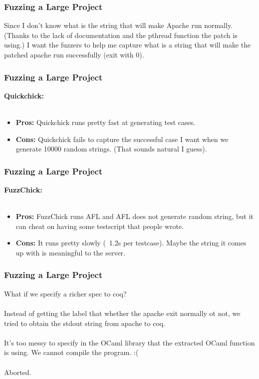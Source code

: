 \documentclass{beamer}
\begin{document}
\begin{frame}
\frametitle{Fuzzing a Large Project}

Since I don't know what is the string that will make Apache run normally.
(Thanks to the lack of documentation and the pthread function the patch is using.)
I want the fuzzers to help me capture what is a string that will make the patched apache run successfully (exit with 0).
    
\end{frame}

\begin{frame}
\frametitle{Fuzzing a Large Project}

\textbf{Quickchick:} \\~\\

\begin{itemize}
    \item \textbf{Pros:} Quickchick runs pretty fast at generating test cases.
    
    \item \textbf{Cons:} Quickchick fails to capture the successful case I want when we generate 10000 random strings. (That sounds natural I guess).
\end{itemize}

\end{frame}

\begin{frame}
\frametitle{Fuzzing a Large Project}
\textbf{FuzzChick:} \\~\\

\begin{itemize}
    \item \textbf{Pros:} FuzzChick runs AFL and AFL does not generate random string, but it can cheat on having some testscript that people wrote.
    
    \item \textbf{Cons:} It runs pretty slowly (~1.2s per testcase). Maybe the string it comes up with is meaningful to the server.
\end{itemize}

\end{frame}

\begin{frame}
\frametitle{Fuzzing a Large Project}
    What if we specify a richer spec to coq? \\~\\
    \pause{}
    Instead of getting the label that whether the apache exit normally ot not, we tried to obtain the stdout string from apache to coq. \\~\\
    \pause{}
    It's too messy to specify in the OCaml library that the extracted OCaml function is using. We cannot compile the program. :(  \\~\\
    \pause{}
    Aborted.
\end{frame}
\end{document}
